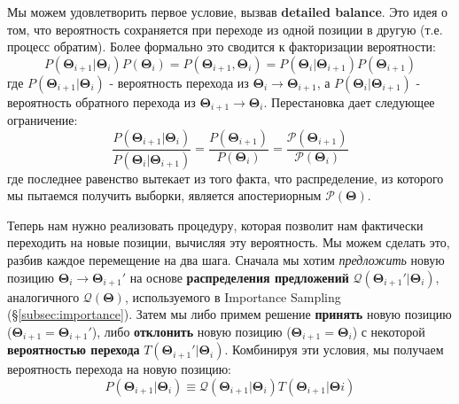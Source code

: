 \documentclass[12pt, titlepage]{article}
\newcommand{\params}{\ensuremath{\boldsymbol\Theta}}
\newcommand{\posterior}{\ensuremath{\mathcal{P}}}
\newcommand{\proposal}{\ensuremath{\mathcal{Q}}}
\begin{document}
Мы можем удовлетворить первое условие, вызвав \textbf{detailed balance}. Это идея о том, что вероятность сохраняется при переходе из одной позиции в другую (т.е. процесс обратим). Более формально это сводится к факторизации вероятности:
\begin{equation}
    P(\params_{i+1}|\params_i) P(\params_i) 
    = P(\params_{i+1}, \params_i)
    = P(\params_i|\params_{i+1}) P(\params_{i+1}) 
\end{equation}
где $P(\params_{i+1}|\params_i)$ - вероятность перехода из $\params_i \rightarrow \params_{i+1}$, а $P(\params_{i}|\params_{i+1})$ - вероятность обратного перехода из $\params_{i+1} \rightarrow \params_i$. 
Перестановка дает следующее ограничение:
\begin{equation}
    \frac{P(\params_{i+1}|\params_i)}{P(\params_i|\params_{i+1})} 
    = \frac{P(\params_{i+1})}{P(\params_i)}
    = \frac{\posterior(\params_{i+1})}{\posterior(\params_i)}
\end{equation}
где последнее равенство вытекает из того факта, что распределение, из которого мы пытаемся получить выборки, является апостериорным $\posterior(\params)$.

Теперь нам нужно реализовать процедуру, которая позволит нам фактически переходить на новые позиции, вычисляя эту вероятность. Мы можем сделать это, разбив каждое перемещение на два шага. Сначала мы хотим \textit{предложить} новую позицию $\params_i \rightarrow \params_{i+1}'$ на основе \textbf{распределения предложений} $\proposal(\params_{i+1}'|\params_i)$, аналогичного $\proposal(\params)$, используемого в Importance Sampling (\S\ref{subsec:importance}). Затем мы либо примем решение \textbf{принять} новую позицию ($\params_{i+1}=\params_{i+1}'$), либо \textbf{отклонить} новую позицию ($\params_{i+1}=\params_i$) с некоторой \textbf{вероятностью перехода} $T(\params_{i+1}'|\params_i)$. Комбинируя эти условия, мы получаем вероятность перехода на новую позицию:
\begin{equation}
    P(\params_{i+1}|\params_i) 
    \equiv \proposal(\params_{i+1}|\params_i) T(\params_{i+1}|\params{i})
\end{equation}
\end{document}
